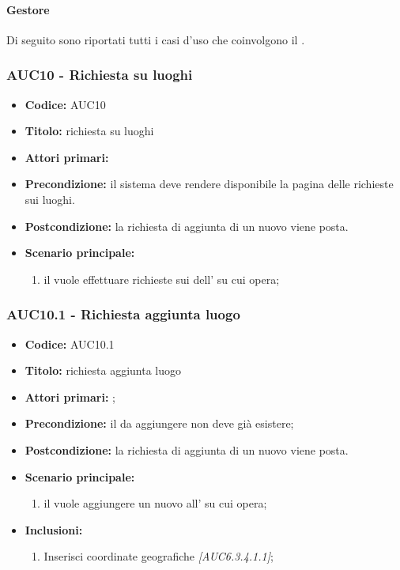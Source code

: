 \documentclass[casi-duso]{subfiles}
\begin{document}
\paragraph{Gestore}
Di seguito sono riportati tutti i casi d'uso che coinvolgono il  .

\subsubsection{AUC10 - Richiesta su luoghi}%
\label{subsub:AUC10}
\begin{itemize}
  \item \textbf{Codice:} AUC10
  \item \textbf{Titolo:} richiesta su luoghi
  \item \textbf{Attori primari:} 
  \item \textbf{Precondizione:} il sistema deve rendere disponibile la pagina delle richieste sui luoghi.
  \item \textbf{Postcondizione:} la richiesta di aggiunta di un nuovo  viene posta.
  \item \textbf{Scenario principale:}
  \begin{enumerate}
    \item il  vuole effettuare richieste sui  dell' su cui opera;
  \end{enumerate}
\end{itemize}

\subsubsection{AUC10.1 - Richiesta aggiunta luogo}%
\label{subsub:AUC10.1}
\begin{itemize}
  \item \textbf{Codice:} AUC10.1
  \item \textbf{Titolo:} richiesta aggiunta luogo
  \item \textbf{Attori primari:} ;
  \item \textbf{Precondizione:} il  da aggiungere non deve già esistere;
  \item \textbf{Postcondizione:} la richiesta di aggiunta di un nuovo  viene posta.
  \item \textbf{Scenario principale:}
  \begin{enumerate}
    \item il  vuole aggiungere un nuovo  all' su cui opera;
  \end{enumerate}
  \item \textbf{Inclusioni:}
  \begin{enumerate}
    \item Inserisci coordinate geografiche \emph{[AUC6.3.4.1.1]};
  \end{enumerate}
\end{itemize}
\end{document}
